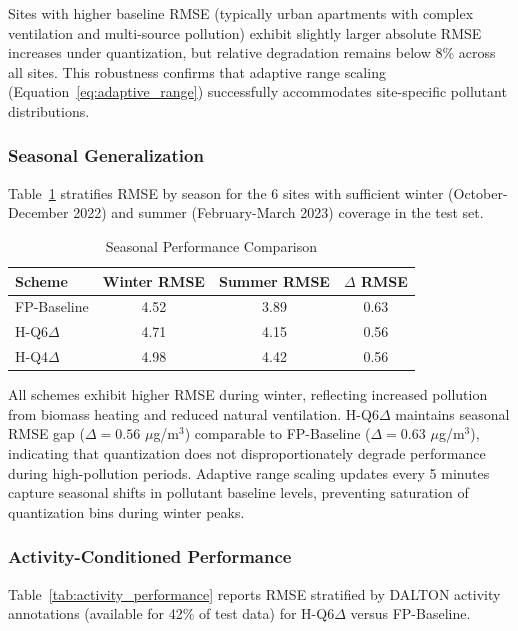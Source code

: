 Sites with higher baseline RMSE (typically urban apartments with complex ventilation and multi-source pollution) exhibit slightly larger absolute RMSE increases under quantization, but relative degradation remains below 8\% across all sites. This robustness confirms that adaptive range scaling (Equation~\eqref{eq:adaptive_range}) successfully accommodates site-specific pollutant distributions.

\subsubsection{Seasonal Generalization}

Table~\ref{tab:seasonal_performance} stratifies RMSE by season for the 6 sites with sufficient winter (October-December 2022) and summer (February-March 2023) coverage in the test set.

\begin{table}[h]
\centering
\caption{Seasonal Performance Comparison}
\label{tab:seasonal_performance}
\begin{tabular}{lccc}
\toprule
\textbf{Scheme} & \textbf{Winter RMSE} & \textbf{Summer RMSE} & \textbf{$\Delta$ RMSE} \\
\midrule
FP-Baseline & 4.52 & 3.89 & 0.63 \\
H-Q6$\Delta$ & 4.71 & 4.15 & 0.56 \\
H-Q4$\Delta$ & 4.98 & 4.42 & 0.56 \\
\bottomrule
\end{tabular}
\end{table}

All schemes exhibit higher RMSE during winter, reflecting increased pollution from biomass heating and reduced natural ventilation. H-Q6$\Delta$ maintains seasonal RMSE gap ($\Delta = 0.56$ $\mu$g/m$^3$) comparable to FP-Baseline ($\Delta = 0.63$ $\mu$g/m$^3$), indicating that quantization does not disproportionately degrade performance during high-pollution periods. Adaptive range scaling updates every 5 minutes capture seasonal shifts in pollutant baseline levels, preventing saturation of quantization bins during winter peaks.

\subsubsection{Activity-Conditioned Performance}

Table~\ref{tab:activity_performance} reports RMSE stratified by DALTON activity annotations (available for 42\% of test data) for H-Q6$\Delta$ versus FP-Baseline.

